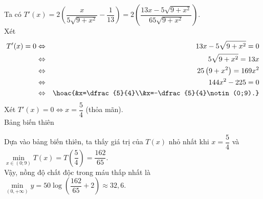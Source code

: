 \begin{bt}
{		Ta có $T'(x)=2\left(\dfrac{x}{5\sqrt{9+x^2}}-\dfrac{1}{13}\right)=2\left(\dfrac{13x-5\sqrt{9+x^2}}{65\sqrt{9+x^2}}\right)$.\\
		Xét
		\allowdisplaybreaks
		\begin{eqnarray*}
			T'(x)=0 &\Leftrightarrow &13x-5\sqrt{9+x^2}=0\\
			&\Leftrightarrow&5\sqrt{9+x^2}=13x\\
			&\Leftrightarrow&25\left(9+x^2\right)=169x^2\\
			&\Leftrightarrow&144x^2-225=0\\
			&\Leftrightarrow&\hoac{&x=\dfrac{5}{4}\\&x=-\dfrac{5}{4}\notin(0;9).}
		\end{eqnarray*}
		Xét $T'(x)=0 \Leftrightarrow x=\dfrac{5}{4}$ (thỏa mãn).\\
		Bảng biến thiên
		\begin{center}
		\end{center}
		Dựa vào bảng biến thiên, ta thấy giá trị của $T(x)$ nhỏ nhất khi $x=\dfrac{5}{4}$ và $\min\limits_{x \in(0;9)} T(x)=T\left(\dfrac{5}{4}\right)=\dfrac{162}{65}$.\\
		Vậy, nồng độ chất độc trong máu thấp nhất là $\min\limits_{(0,+\infty)} y=50 \log \left(\dfrac{162}{65}+2\right) \approx 32{,}6$.
	}
\end{bt}

